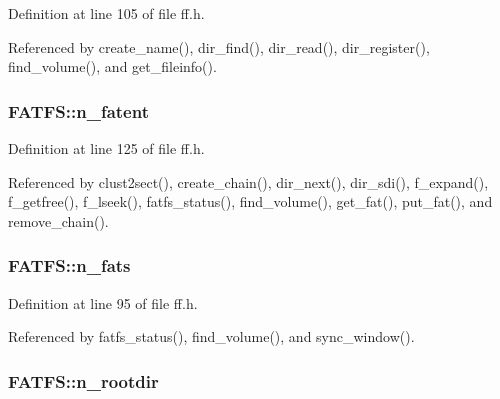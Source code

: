 Definition at line 105 of file ff.\+h.



Referenced by create\+\_\+name(), dir\+\_\+find(), dir\+\_\+read(), dir\+\_\+register(), find\+\_\+volume(), and get\+\_\+fileinfo().

\subsubsection[{\texorpdfstring{n\+\_\+fatent}{n_fatent}}]{ F\+A\+T\+F\+S\+::n\+\_\+fatent}\hypertarget{structFATFS_a8da50eeba6469bc20d60ca0cf9a1307c}{}\label{structFATFS_a8da50eeba6469bc20d60ca0cf9a1307c}


Definition at line 125 of file ff.\+h.



Referenced by clust2sect(), create\+\_\+chain(), dir\+\_\+next(), dir\+\_\+sdi(), f\+\_\+expand(), f\+\_\+getfree(), f\+\_\+lseek(), fatfs\+\_\+status(), find\+\_\+volume(), get\+\_\+fat(), put\+\_\+fat(), and remove\+\_\+chain().

\subsubsection[{\texorpdfstring{n\+\_\+fats}{n_fats}}]{ F\+A\+T\+F\+S\+::n\+\_\+fats}\hypertarget{structFATFS_a56716c7e7ac10cf46e73ffb2a2e9b545}{}\label{structFATFS_a56716c7e7ac10cf46e73ffb2a2e9b545}


Definition at line 95 of file ff.\+h.



Referenced by fatfs\+\_\+status(), find\+\_\+volume(), and sync\+\_\+window().

\subsubsection[{\texorpdfstring{n\+\_\+rootdir}{n_rootdir}}]{ F\+A\+T\+F\+S\+::n\+\_\+rootdir}\hypertarget{structFATFS_a189a00aa038044ffad0fc7f7dcf2aae1}{}\label{structFATFS_a189a00aa038044ffad0fc7f7dcf2aae1}



